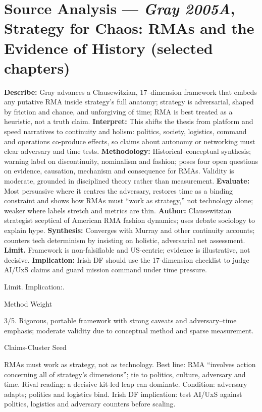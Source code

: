 \section*{Source Analysis — \textit{Gray 2005A}, Strategy for Chaos: RMAs and the Evidence of History (selected chapters)}
\textbf{Describe:} Gray advances a Clausewitzian, 17–dimension framework that embeds any putative RMA inside strategy’s full anatomy; strategy is adversarial, shaped by friction and chance, and unforgiving of time; RMA is best treated as a heuristic, not a truth claim.
\textbf{Interpret:} This shifts the thesis from platform and speed narratives to continuity and holism: politics, society, logistics, command and operations co-produce effects, so claims about autonomy or networking must clear adversary and time tests.
\textbf{Methodology:} Historical–conceptual synthesis; warning label on discontinuity, nominalism and fashion; poses four open questions on evidence, causation, mechanism and consequence for RMAs. Validity is moderate, grounded in disciplined theory rather than measurement.
\textbf{Evaluate:} Most persuasive where it centres the adversary, restores time as a binding constraint and shows how RMAs must “work as strategy,” not technology alone; weaker where labels stretch and metrics are thin.
\textbf{Author:} Clausewitzian strategist sceptical of American RMA fashion dynamics; uses debate sociology to explain hype.
\textbf{Synthesis:} Converges with Murray and other continuity accounts; counters tech determinism by insisting on holistic, adversarial net assessment.
\textbf{Limit.} Framework is non-falsifiable and US-centric; evidence is illustrative, not decisive.
\textbf{Implication:} Irish DF should use the 17-dimension checklist to judge AI/UxS claims and guard mission command under time pressure.

Limit. Implication:.

Method Weight

3/5. Rigorous, portable framework with strong caveats and adversary–time emphasis; moderate validity due to conceptual method and sparse measurement.

Claims-Cluster Seed

RMAs must work as strategy, not as technology.
Best line: RMA “involves action concerning all of strategy’s dimensions”; tie to politics, culture, adversary and time.
Rival reading: a decisive kit-led leap can dominate.
Condition: adversary adapts; politics and logistics bind.
Irish DF implication: test AI/UxS against politics, logistics and adversary counters before scaling.

